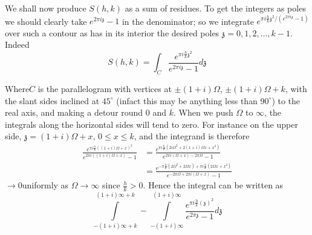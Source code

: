 We shall now produce $S(h, k)$ as a sum of residues. To get the
integers as poles we should clearly take $e^{2 \pi i \mathfrak{z}}-1$
in the denominator; so we integrate $e^{\pi i \frac{h}{k}
  \mathfrak{z}^2/(e^{2 \pi i \mathfrak{z}}-1)}$ over such a contour as
has in its interior the desired poles $\mathfrak{z} =0, 1, 2, \ldots ,
k-1$. Indeed 
$$
S(h, k)= \int_C \frac{e^{\pi i \frac{h}{k} \mathfrak{z}^2}}{e^{2 \pi i
  \mathfrak{z}}-1} d \mathfrak{z}
$$
\begin{figure}[H]
\end{figure}
Where\pageoriginale $C$ is the parallelogram with vertices at $\pm (1+ i) \Omega$,
$\pm (1+i) \Omega + k$, with the slant sides inclined at $45^\circ$
(infact this may be anything less than $90^\circ$) to the real axis,
and making a detour round 0 and $k$. When we push $\Omega$ to $\infty$,
the integrals along the horizontal sides will tend to zero. For
instance on the upper side, $\mathfrak{z} = (1+i) \Omega +x$, $0 \leq
x \leq k$, and the integrand is therefore
\begin{align*}
  \frac{e^{\pi i \frac{h}{k} ((1+i) \Omega +x)^2}}{e^{2 \pi i ((1+i)
    \Omega +x)}-1} & = \frac{e^{\pi i \frac{h}{k} (2i \Omega^2 + 2(1+i)
    \Omega x+ x^2)}}{e^{2 \pi i (\Omega +x)-2 \pi \Omega}-1}\\
  & = \frac{e^{- \pi \frac{h}{k} (2 \Omega^2 + 2 \Omega x) + \pi i
      \frac{h}{k} (2 \Omega x + x^2)}}{e^{- 2 \pi \Omega + 2 \pi i
      (\Omega +x)}-1}
\end{align*}
$\to 0$\pageoriginale uniformly as $\Omega \to \infty$ since $\frac{h}{k} >
0$. Hence the integral can be written as
$$
\int\limits^{(1+i) \infty+k}_{- (1+i)\infty +k}- \int\limits_{-
  (1+i)\infty}^{(1+i)\infty}  \frac{e^{\pi i \frac{h}{k}
  (\mathfrak{z})^2}}{e^{2 \pi  \mathfrak{z}}-1} d \mathfrak{z} 
$$
